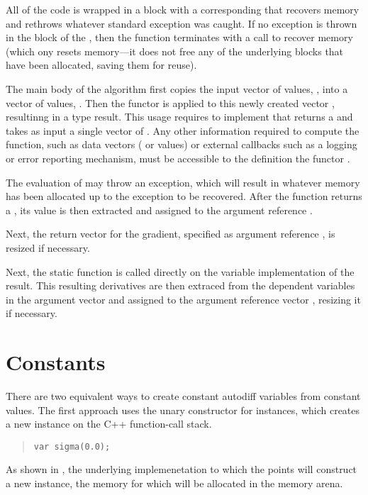 \documentclass[10pt]{article}
\begin{document}
All of the code is wrapped in a  block with a corresponding
 that recovers memory and rethrows whatever standard
exception was caught.  If no exception is thrown in the block of the
, then the function terminates with a call to recover
memory (which ony resets memory---it does not free any of the
underlying blocks that have been allocated, saving them for reuse).

The main body of the algorithm first copies the input vector of
 values, , into a vector of  values,
.  Then the functor  is applied to this newly
created vector , resultinng in a type  result.
This usage requires  to implement  that
returns a  and takes as input a single vector of .
Any other information required to compute the function, such as data
vectors ( or  values) or external callbacks
such as a logging or error reporting mechanism, must be accessible to
the  definition the functor .

The evaluation of  may throw an exception, which will result
in whatever memory has been allocated up to the exception to be
recovered.  After the function returns a , its value is then
extracted and assigned to the argument reference .

Next, the return vector for the gradient, specified as argument
reference , is resized if necessary.  

Next, the static  function is called directly on the
variable implementation of the result.  This resulting derivatives are
then extraced from the dependent variables in the argument vector and
assigned to the argument reference vector , resizing it
if necessary.



\section{Constants}

There are two equivalent ways to create constant autodiff variables
from constant  values.  The first approach uses the unary
constructor for  instances, which creates a new 
instance  on the C++ function-call stack.
%
\begin{quote}
\begin{Verbatim}
var sigma(0.0);
\end{Verbatim}
\end{quote}
%
As shown in , the underlying
 implemenetation to which the  points will
construct a new instance, the memory for which will be allocated in
the memory arena.
\end{document}
